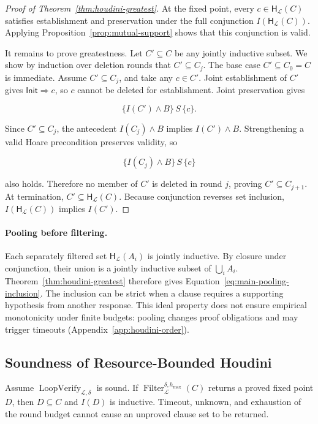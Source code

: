 \begin{proof}[Proof of Theorem~\ref{thm:houdini-greatest}]
At the fixed point, every \(c\in\mathsf H_{\mathcal L}(C)\) satisfies
establishment and preservation under the full conjunction
\(I(\mathsf H_{\mathcal L}(C))\).  Applying
Proposition~\ref{prop:mutual-support} shows that this conjunction is valid.

It remains to prove greatestness.  Let \(C'\subseteq C\) be any jointly
inductive subset.  We show by induction over deletion rounds that
\(C'\subseteq C_j\).  The base case \(C'\subseteq C_0=C\) is immediate.  Assume
\(C'\subseteq C_j\), and take any \(c\in C'\).  Joint establishment of \(C'\)
gives \(\mathsf{Init}\Rightarrow c\), so \(c\) cannot be deleted for establishment.  Joint
preservation gives

\[
  \{I(C')\wedge B\}\,S\,\{c\}.
\]

Since \(C'\subseteq C_j\), the antecedent \(I(C_j)\wedge B\) implies
\(I(C')\wedge B\).  Strengthening a valid Hoare precondition preserves
validity, so

\[
  \{I(C_j)\wedge B\}\,S\,\{c\}
\]

also holds.  Therefore no member of \(C'\) is deleted in round \(j\), proving
\(C'\subseteq C_{j+1}\).  At termination,
\(C'\subseteq\mathsf H_{\mathcal L}(C)\).  Because conjunction reverses set
inclusion, \(I(\mathsf H_{\mathcal L}(C))\) implies \(I(C')\).
\end{proof}

\paragraph{Pooling before filtering.}
Each separately filtered set \(\mathsf H_{\mathcal L}(A_i)\) is jointly
inductive.  By closure under conjunction, their union is a jointly inductive
subset of \(\bigcup_i A_i\).  Theorem~\ref{thm:houdini-greatest} therefore
gives Equation~\eqref{eq:main-pooling-inclusion}.  The inclusion can be strict
when a clause requires a supporting hypothesis from another response.
This ideal property does not ensure empirical monotonicity under finite
budgets: pooling changes proof obligations and may trigger timeouts
(Appendix~\ref{app:houdini-order}).

\subsection{Soundness of Resource-Bounded Houdini}

\begin{proposition}
\label{prop:bounded-houdini-sound}
Assume \(\operatorname{LoopVerify}_{\mathcal L,\delta}\) is sound.  If
\(\operatorname{Filter}_{\mathcal L}^{\delta,h_{\max}}(C)\) returns a proved
fixed point \(D\), then \(D\subseteq C\) and \(I(D)\) is inductive.  Timeout,
unknown, and exhaustion of the round budget cannot cause an unproved clause
set to be returned.
\end{proposition}

